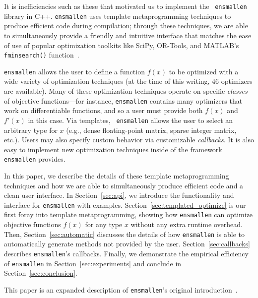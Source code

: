 It is inefficiencies such as these that motivated us to implement the {\tt
ensmallen} library in C++.  {\tt ensmallen} uses template metaprogramming
techniques to produce efficient code during compilation; through these
techniques, we are able to simultaneously provide a friendly and intuitive
interface that matches the ease of use of popular optimization toolkits like
SciPy, OR-Tools, and MATLAB's {\tt fminsearch()}
function~\cite{matlab_fminsearch}.

{\tt ensmallen} allows the user to define a function $f(x)$ to be optimized with
a wide variety of optimization techniques (at the time of this writing, 46
optimizers are available).  Many of these optimization techniques operate on
specific {\it classes} of objective functions---for instance, {\tt ensmallen}
contains many optimizers that work on differentiable functions, and so a user
must provide both $f(x)$ and $f'(x)$ in this case.  Via templates, {\tt
ensmallen} allows the user to select an arbitrary type for $x$ (e.g., dense
floating-point matrix, sparse integer matrix, etc.).  Users may also specify
custom behavior via customizable {\it callbacks}.  It is also easy to implement
new optimization techniques inside of the framework {\tt ensmallen} provides.

In this paper, we describe the details of these template metaprogramming
techniques and how we are able to simultaneously produce efficient code and a
clean user interface.  In Section~\ref{sec:api}, we introduce the functionality
and interface for {\tt ensmallen} with examples.
Section~\ref{sec:templated_optimize} is our first foray into template
metaprogramming, showing how {\tt ensmallen} can optimize objective functions
$f(x)$ for any type $x$ without any extra runtime overhead.  Then,
Section~\ref{sec:automatic} discusses the details of how {\tt ensmallen} is able
to automatically generate methods not provided by the user.
Section~\ref{sec:callbacks} describes {\tt ensmallen}'s callbacks.
Finally, we demonstrate the empirical efficiency of {\tt ensmallen} in
Section~\ref{sec:experiments} and conclude in Section~\ref{sec:conclusion}.

This paper is an expanded description of {\tt ensmallen}'s original
introduction~\cite{ensmallen2018, curtin2017generic}.
